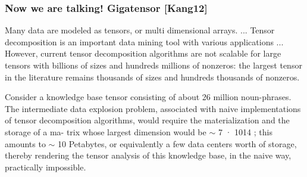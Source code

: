 \begin{frame}[plain]
	\frametitle{Now we are talking! Gigatensor [Kang12]}
	\begin{block}{}
    Many data are modeled as tensors, or multi dimensional arrays. 
    ... Tensor decomposition is an important data
    mining tool with various applications ... However, current tensor
    decomposition algorithms are 
    not scalable for large tensors with billions of sizes and hundreds
    millions of nonzeros: the largest tensor in the literature remains
    thousands of sizes and hundreds thousands of nonzeros. 
	\end{block}
	\begin{block}{}
    Consider a knowledge base tensor consisting of about 26 million
    noun-phrases. The intermediate data explosion problem, associated
    with naive implementations of tensor decomposition algorithms,
    would require the materialization and the storage of a ma-  
    trix whose largest dimension would be $\sim$ 7 · 1014 ; this amounts to 
    $\sim$ 10 Petabytes, or equivalently a few data centers worth of storage, 
    thereby rendering the tensor analysis of this knowledge base, in the 
    naive way, practically impossible. 
	\end{block}
\end{frame}
